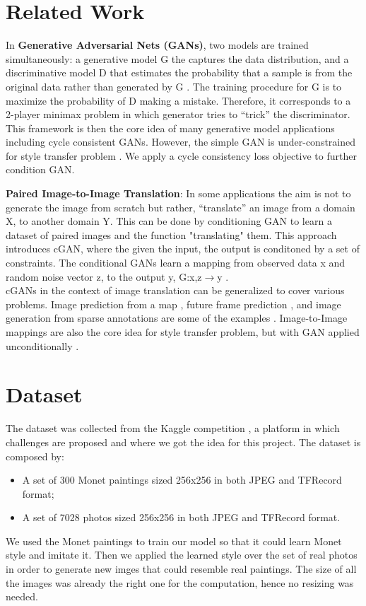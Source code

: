 \documentclass[10pt,twocolumn,letterpaper]{article}
\begin{document}
\section{Related Work}
In \textbf{Generative Adversarial Nets (GANs)}, two models are trained simultaneously: a generative model G the captures the data distribution, and a discriminative model D that estimates the probability that a sample is from the original data rather than generated by G \cite{simplegan}. The training procedure for G is to maximize the probability of D making a mistake. Therefore, it corresponds to a 2-player minimax problem in which generator tries to “trick” the discriminator. This framework is then the core idea of many generative model applications including cycle consistent GANs. However, the simple GAN is under-constrained for style transfer problem \cite{cyclegan}. We apply a cycle consistency loss objective to further condition GAN.  

\textbf{Paired Image-to-Image Translation}: In some applications the aim is not to generate the image from scratch but rather, “translate” an image from a domain X, to another domain Y.  This can be done by conditioning GAN to learn a dataset of paired images and the function "translating" them. This approach introduces cGAN, where the given the input, the output is conditoned by a set of constraints. The conditional GANs learn a mapping from observed data x and random noise vector z, to the output y, G:{x,z}$\rightarrow$y \cite{imgtoimg}.
\\ cGANs in the context of image translation can be generalized to cover various problems. Image prediction from a map \cite{example1}, future frame prediction \cite{example2}, and image generation from sparse annotations are some of the examples \cite{example3}. Image-to-Image mappings are also the core idea for style transfer problem, but with GAN applied unconditionally \cite{example4}.\\

\section{Dataset}

The dataset was collected from the Kaggle competition \cite{kaggle}, a platform in which challenges are proposed and where we got the idea for this project. The dataset is composed by:
\begin{itemize}
\item A set of 300 Monet paintings sized 256x256 in both JPEG and TFRecord format;
\item A set of 7028 photos sized 256x256 in both JPEG and TFRecord format.
\end{itemize}
We used the Monet paintings to train our model so that it could learn Monet style and imitate it. Then we applied the learned style over the set of real photos in order to generate new imges that could resemble real paintings. The size of all the images was already the right one for the computation, hence no resizing was needed. 
\end{document}
